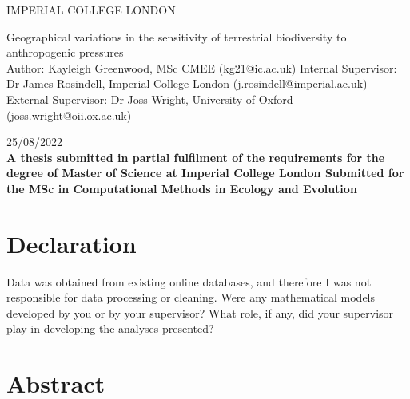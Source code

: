 \documentclass[11pt, a4paper, titlepage]{article}
\begin{document}
    \begin{titlepage}
    \begin{center}
            {\large IMPERIAL COLLEGE LONDON}
    \end{center}
    
    \vspace*{\fill}
    
    \begin{center}
        {\Huge 
    	 Geographical variations in the sensitivity of terrestrial biodiversity to anthropogenic pressures}
        \\[2in]
        Author: Kayleigh Greenwood, MSc CMEE (kg21@ic.ac.uk)
        \bigskip
        \newline
       Internal Supervisor: Dr James Rosindell, Imperial College London (j.rosindell@imperial.ac.uk)
       \bigskip
       \newline
        External Supervisor: Dr Joss Wright, University of Oxford (joss.wright@oii.ox.ac.uk)
        \bigskip
        \newline

        25/08/2022
        \\[2in]
        
        {\bfseries A thesis submitted in partial fulfilment of the requirements for the degree of Master of Science at Imperial College London \newline \newline Submitted for the MSc in Computational Methods in Ecology and Evolution }

        

    
	\end{center}
    \vspace{\fill}
    
    \end{titlepage}
	\section*{Declaration}
	\begin{center}
	Data was obtained from existing online databases, and therefore I was not responsible for data processing or cleaning. \newline
	Were any mathematical models developed by you or by your supervisor? \newline
	What role, if any, did your supervisor play in developing the analyses presented?
	\end{center}
	\newpage
	
	\section*{Abstract}
	\newpage
	
\end{document}
